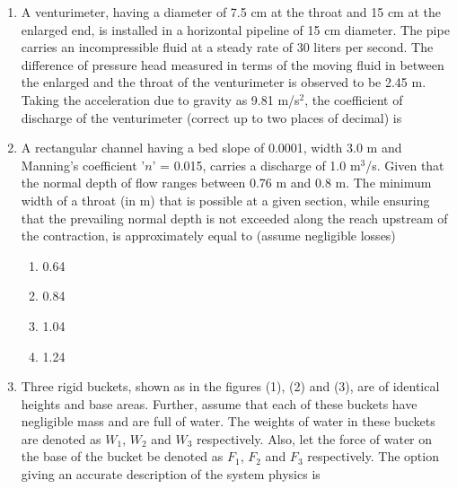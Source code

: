 \documentclass[journal,12pt,onecolumn]{IEEEtran}
\theoremstyle{remark}
\begin{document}
\begin{enumerate}
\begin{multicols}{4}
\begin{enumerate}
\item 90
\item 80
\item 70
\item 60
\end{enumerate}
\end{multicols}

\item A venturimeter, having a diameter of 7.5 cm at the throat and 15 cm at the enlarged end, is installed in a horizontal pipeline of 15 cm diameter. The pipe carries an incompressible fluid at a steady rate of 30 liters per second. The difference of pressure head measured in terms of the moving fluid in between the enlarged and the throat of the venturimeter is observed to be 2.45 m. Taking the acceleration due to gravity as 9.81 m/s$^2$, the coefficient of discharge of the venturimeter (correct up to two places of decimal) is \hfill{}

\item A rectangular channel having a bed slope of 0.0001, width 3.0 m and Manning's coefficient '$n$' = 0.015, carries a discharge of 1.0 m$^3$/s. Given that the normal depth of flow ranges between 0.76 m and 0.8 m. The minimum width of a throat (in m) that is possible at a given section, while ensuring that the prevailing normal depth is not exceeded along the reach upstream of the contraction, is approximately equal to (assume negligible losses) \hfill{}

\begin{multicols}{4}
\begin{enumerate}
\item 0.64
\item 0.84
\item 1.04
\item 1.24
\end{enumerate}
\end{multicols}




\item Three rigid buckets, shown as in the figures (1), (2) and (3), are of identical heights and base areas. Further, assume that each of these buckets have negligible mass and are full of water. The weights of water in these buckets are denoted as $W_1$, $W_2$ and $W_3$ respectively. Also, let the force of water on the base of the bucket be denoted as $F_1$, $F_2$ and $F_3$ respectively. The option giving an accurate description of the system physics is \hfill{}


\end{enumerate}
\end{document}
